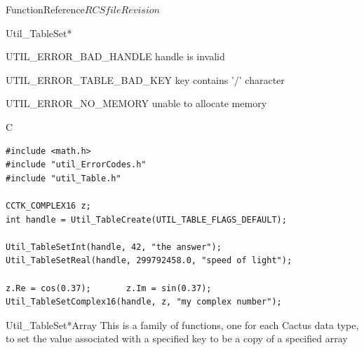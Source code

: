 \begin{cactuspart}{FunctionReference}{$RCSfile$}{$Revision$}
\begin{FunctionDescription}{Util\_TableSet*}
\begin{ErrorSection}
\begin{Error}{UTIL\_ERROR\_BAD\_HANDLE}
handle is invalid
\end{Error}
\begin{Error}{UTIL\_ERROR\_TABLE\_BAD\_KEY}
key contains '/' character
\end{Error}
\begin{Error}{UTIL\_ERROR\_NO\_MEMORY}
unable to allocate memory
\end{Error}
\end{ErrorSection}

\begin{ExampleSection}
\begin{Example}{C}
\begin{verbatim}
#include <math.h>
#include "util_ErrorCodes.h"
#include "util_Table.h"

CCTK_COMPLEX16 z;
int handle = Util_TableCreate(UTIL_TABLE_FLAGS_DEFAULT);

Util_TableSetInt(handle, 42, "the answer");
Util_TableSetReal(handle, 299792458.0, "speed of light");

z.Re = cos(0.37);       z.Im = sin(0.37);
Util_TableSetComplex16(handle, z, "my complex number");
\end{verbatim}
\end{Example}
\end{ExampleSection}
\end{FunctionDescription}


\begin{FunctionDescription}{Util\_TableSet*Array}
\label{Util-TableSet*Array}
This is a family of functions, one for each Cactus data type,
to set the value associated with a specified key to be a copy
of a specified array


\end{FunctionDescription}
\end{cactuspart}
